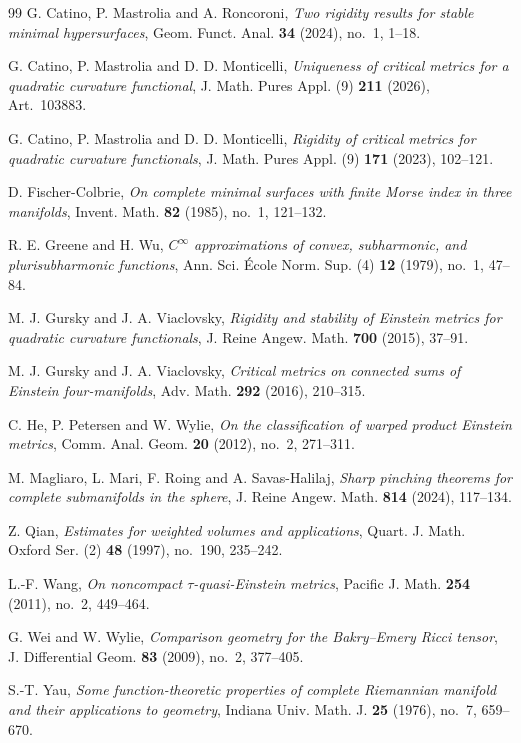 \documentclass[11pt]{amsart}
\numberwithin{equation}{section}
\begin{document}
\begin{thebibliography}{99}
G. Catino, P. Mastrolia and A. Roncoroni,
\emph{Two rigidity results for stable minimal hypersurfaces},
Geom. Funct. Anal. \textbf{34} (2024), no.~1, 1--18.

G. Catino, P. Mastrolia and D. D. Monticelli,
\emph{Uniqueness of critical metrics for a quadratic curvature functional},
J. Math. Pures Appl. (9) \textbf{211} (2026), Art.~103883.

G. Catino, P. Mastrolia and D. D. Monticelli,
\emph{Rigidity of critical metrics for quadratic curvature functionals},
J. Math. Pures Appl. (9) \textbf{171} (2023), 102--121.

D. Fischer-Colbrie,
\emph{On complete minimal surfaces with finite Morse index in three manifolds},
Invent. Math. \textbf{82} (1985), no.~1, 121--132.

R. E. Greene and H. Wu,
\emph{$C^\infty$ approximations of convex, subharmonic, and plurisubharmonic functions},
Ann. Sci. \'{E}cole Norm. Sup. (4) \textbf{12} (1979), no.~1, 47--84.

M. J. Gursky and J. A. Viaclovsky,
\emph{Rigidity and stability of Einstein metrics for quadratic curvature functionals},
J. Reine Angew. Math. \textbf{700} (2015), 37--91.

M. J. Gursky and J. A. Viaclovsky,
\emph{Critical metrics on connected sums of Einstein four-manifolds},
Adv. Math. \textbf{292} (2016), 210--315.

C. He, P. Petersen and W. Wylie,
\emph{On the classification of warped product Einstein metrics},
Comm. Anal. Geom. \textbf{20} (2012), no.~2, 271--311.

M. Magliaro, L. Mari, F. Roing and A. Savas-Halilaj,
\emph{Sharp pinching theorems for complete submanifolds in the sphere},
J. Reine Angew. Math. \textbf{814} (2024), 117--134.

Z. Qian,
\emph{Estimates for weighted volumes and applications},
Quart. J. Math. Oxford Ser. (2) \textbf{48} (1997), no.~190, 235--242.

L.-F. Wang,
\emph{On noncompact $\tau$-quasi-Einstein metrics},
Pacific J. Math. \textbf{254} (2011), no.~2, 449--464.

G. Wei and W. Wylie,
\emph{Comparison geometry for the Bakry--Emery Ricci tensor},
J. Differential Geom. \textbf{83} (2009), no.~2, 377--405.

S.-T. Yau,
\emph{Some function-theoretic properties of complete Riemannian manifold and their applications to geometry},
Indiana Univ. Math. J. \textbf{25} (1976), no.~7, 659--670.

\end{thebibliography}
\end{document}
